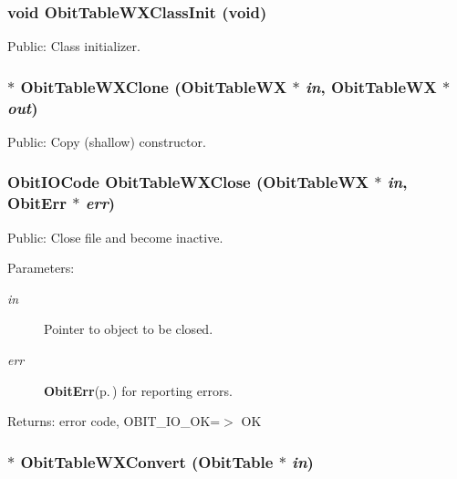 \subsubsection{\setlength{\rightskip}{0pt plus 5cm}void Obit\-Table\-WXClass\-Init (void)}\label{ObitTableWX_8h_a10}


Public: Class initializer. 

\subsubsection{$\ast$ Obit\-Table\-WXClone ({\bf Obit\-Table\-WX} $\ast$ {\em in}, {\bf Obit\-Table\-WX} $\ast$ {\em out})}\label{ObitTableWX_8h_a15}


Public: Copy (shallow) constructor. 

\subsubsection{\setlength{\rightskip}{0pt plus 5cm}Obit\-IOCode Obit\-Table\-WXClose ({\bf Obit\-Table\-WX} $\ast$ {\em in}, {\bf Obit\-Err} $\ast$ {\em err})}\label{ObitTableWX_8h_a21}


Public: Close file and become inactive. 

\begin{Desc}
\item[Parameters:]
\begin{description}
\item[{\em in}]Pointer to object to be closed. \item[{\em err}]{\bf Obit\-Err}{\rm (p.\,\pageref{structObitErr})} for reporting errors. \end{description}
\end{Desc}
\begin{Desc}
\item[Returns:]error code, OBIT\_\-IO\_\-OK=$>$ OK \end{Desc}
\subsubsection{$\ast$ Obit\-Table\-WXConvert ({\bf Obit\-Table} $\ast$ {\em in})}\label{ObitTableWX_8h_a16}


